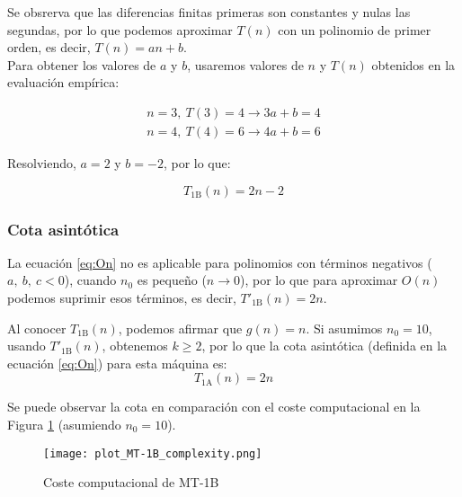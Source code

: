 Se obsrerva que las diferencias finitas primeras son constantes y nulas las segundas, por lo que podemos aproximar $T(n)$ con un polinomio de primer orden, es decir, $T(n) = an + b$.\\

Para obtener los valores de $a$ y $b$, usaremos valores de $n$ y $T(n)$ obtenidos en la evaluación empírica:

\begin{subequations}
    \begin{gather}
        n = 3,\ T(3) = 4 \rightarrow 3a + b = 4 \\
        n = 4,\ T(4) = 6 \rightarrow 4a + b = 6
    \end{gather}
\end{subequations}

Resolviendo, $a = 2$ y $b = -2$, por lo que:

\begin{equation}
    T_{\mathrm{1B}}(n) = 2n - 2
\end{equation}

\subsubsection*{Cota asintótica}
La ecuación \ref{eq:On} no es aplicable para polinomios con términos negativos ($a,\ b,\ c < 0$), cuando $n_0$ es pequeño ($n \rightarrow 0$), por lo que para aproximar $O(n)$ podemos suprimir esos términos, es decir, $T'_{\mathrm{1B}}(n) = 2n$.

Al conocer $T_{\mathrm{1B}}(n)$, podemos afirmar que $g(n) = n$. Si asumimos $n_0 = 10$, usando $T'_{\mathrm{1B}}(n)$, obtenemos $k \geq 2$, por lo que la cota asintótica (definida en la ecuación \ref{eq:On}) para esta máquina es:
\begin{equation}
    T_{\mathrm{1A}}(n) = 2n
\end{equation}

Se puede observar la cota en comparación con el coste computacional en la Figura \ref{fig:MT-1B_plot} (asumiendo $n_0 = 10$).


\begin{figure}[h]
    \centering
    \texttt{[image: plot\_MT-1B\_complexity.png]}
    \caption{Coste computacional de MT-1B}
    \label{fig:MT-1B_plot}
\end{figure}